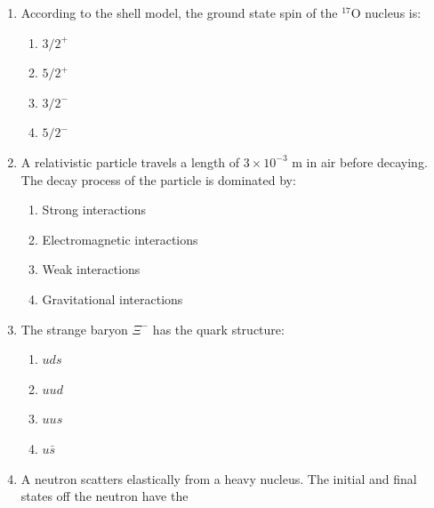 \documentclass[journal,12pt,onecolumn]{IEEEtran}
\begin{document}
\begin{enumerate}[itemsep = 1em]
\item According to the shell model, the ground state spin of the $^{17}$O nucleus is:  

\hfill{}

\begin{multicols}{2}
\begin{enumerate}
    \item $3/2^+$
    \item $5/2^+$
    \item $3/2^-$
    \item $5/2^-$
\end{enumerate}
\end{multicols}

\item A relativistic particle travels a length of $3 \times 10^{-3}$ m in air before decaying. The decay process of the particle is dominated by:  

\hfill{}

\begin{multicols}{2}
\begin{enumerate}
    \item Strong interactions
    \item Electromagnetic interactions
    \item Weak interactions
    \item Gravitational interactions
\end{enumerate}
\end{multicols}

\item The strange baryon $\Xi^-$ has the quark structure:  

\hfill{}

\begin{multicols}{4}
\begin{enumerate}
    \item $uds$
    \item $uud$
    \item $uus$
    \item $u\bar{s}$
\end{enumerate} 
\end{multicols}


\item A neutron scatters elastically from a heavy nucleus. The initial and final states off the neutron have the

\hfill{}


\end{enumerate}
\end{document}
